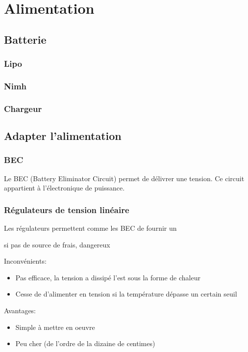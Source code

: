 \documentclass[a4paper, 11pt]{report}
\begin{document}
\chapter{Alimentation}

\section{Batterie}

\subsection{Lipo}

\subsection{Nimh}

\subsection{Chargeur}



\section{Adapter l'alimentation}

\subsection{BEC}
Le BEC (Battery Eliminator Circuit) permet de délivrer une tension. Ce circuit appartient à l'électronique de puissance.

\subsection{Régulateurs de tension linéaire}
Les régulateurs permettent comme les BEC de fournir un

si pas de source de frais, dangereux

Inconvénients:
\begin{itemize}
\item Pas efficace, la tension a dissipé l'est sous la forme de chaleur
\item Cesse de d'alimenter en tension si la température dépasse un certain seuil
\end{itemize}

Avantages:
\begin{itemize}
\item Simple à mettre en oeuvre
\item Peu cher (de l'ordre de la dizaine de centimes)
\end{itemize}
\end{document}
